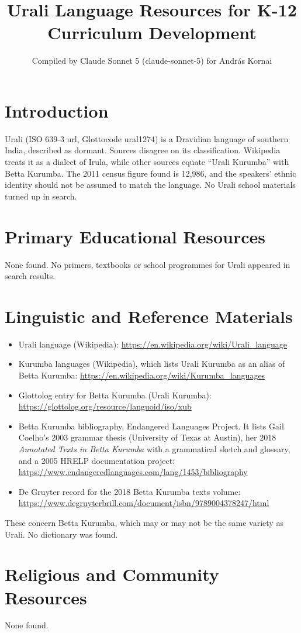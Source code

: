 \documentclass[12pt]{article}
\title{Urali Language Resources for K-12 Curriculum Development}
\author{Compiled by Claude Sonnet 5 (claude-sonnet-5) for Andr\'as Kornai}
\date{}
\begin{document}
\maketitle
\section{Introduction}
Urali (ISO 639-3 url, Glottocode ural1274) is a Dravidian language of southern India, described as dormant. Sources disagree on its classification. Wikipedia treats it as a dialect of Irula, while other sources equate ``Urali Kurumba'' with Betta Kurumba. The 2011 census figure found is 12,986, and the speakers' ethnic identity should not be assumed to match the language. No Urali school materials turned up in search.
\section{Primary Educational Resources}
None found. No primers, textbooks or school programmes for Urali appeared in search results.
\section{Linguistic and Reference Materials}
\begin{itemize}
\item Urali language (Wikipedia): \url{https://en.wikipedia.org/wiki/Urali_language}
\item Kurumba languages (Wikipedia), which lists Urali Kurumba as an alias of Betta Kurumba: \url{https://en.wikipedia.org/wiki/Kurumba_languages}
\item Glottolog entry for Betta Kurumba (Urali Kurumba): \url{https://glottolog.org/resource/languoid/iso/xub}
\item Betta Kurumba bibliography, Endangered Languages Project. It lists Gail Coelho's 2003 grammar thesis (University of Texas at Austin), her 2018 \emph{Annotated Texts in Betta Kurumba} with a grammatical sketch and glossary, and a 2005 HRELP documentation project: \url{https://www.endangeredlanguages.com/lang/1453/bibliography}
\item De Gruyter record for the 2018 Betta Kurumba texts volume: \url{https://www.degruyterbrill.com/document/isbn/9789004378247/html}
\end{itemize}
These concern Betta Kurumba, which may or may not be the same variety as Urali. No dictionary was found.
\section{Religious and Community Resources}
None found.
\end{document}
